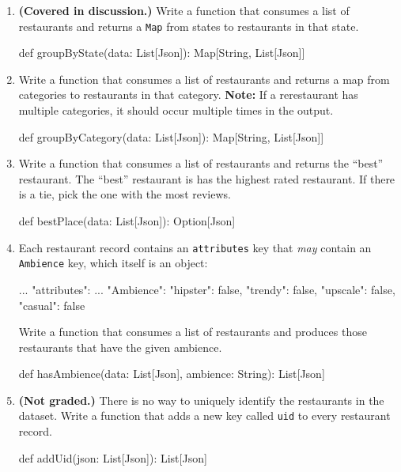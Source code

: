 \documentclass[9pt]{extbook}
\begin{document}
\begin{enumerate}
    \item \textbf{(Covered in discussion.)} Write a function that consumes a
    list of restaurants and returns a \lstinline|Map| from states to
    restaurants in that state.
    \begin{scalacode}
    def groupByState(data: List[Json]): Map[String, List[Json]]
    \end{scalacode}

    \item Write a function that consumes a list of restaurants and returns a
    map from categories to restaurants in that category.
    \textbf{Note:} If a rerestaurant has multiple categories, it should
    occur multiple times in the output.
    \begin{scalacode}
    def groupByCategory(data: List[Json]): Map[String, List[Json]]
    \end{scalacode}

    \item Write a function that consumes a list of restaurants and returns the
    ``best'' restaurant. The ``best'' restaurant is has the highest rated
    restaurant. If there is a tie, pick the one with the most reviews.
    \begin{scalacode}
    def bestPlace(data: List[Json]): Option[Json]
    \end{scalacode}

    \item Each restaurant record contains an \texttt{attributes} key that
    \textit{may} contain an \texttt{Ambience} key, which
    itself is an object:
    \begin{scalacode}
    {   ...
        "attributes": {
            ...
            "Ambience": {
                "hipster": false,
                "trendy": false,
                "upscale": false,
                "casual": false
            }
        }
    }
    \end{scalacode}
    Write a function that consumes a list of restaurants and produces those
    restaurants that have the given ambience.
    \begin{scalacode}
    def hasAmbience(data: List[Json], ambience: String): List[Json]
    \end{scalacode}

    \item \textbf{(Not graded.)} There
    is no way to uniquely identify the restaurants in the dataset. 
    Write a function that adds a
    new key called \verb|uid| to every restaurant record.
    \begin{scalacode}
    def addUid(json: List[Json]): List[Json]
    \end{scalacode}

\end{enumerate}
\end{document}
